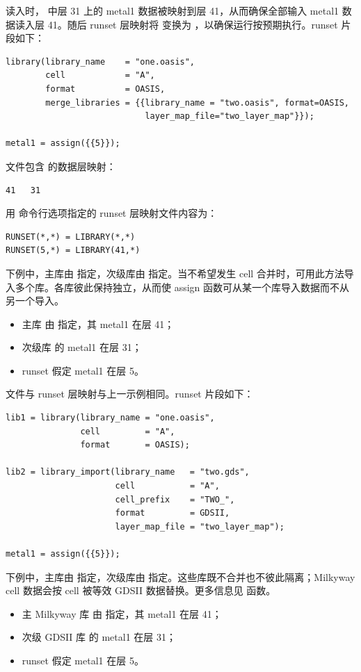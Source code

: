 读入时， 中层 31 上的 metal1 数据被映射到层 41，从而确保全部输入 metal1 数据读入层 41。随后 runset 层映射将  变换为 ，以确保运行按预期执行。runset 片段如下：
\begin{lstlisting}[style=pxl]
library(library_name    = "one.oasis",
        cell            = "A",
        format          = OASIS,
        merge_libraries = {{library_name = "two.oasis", format=OASIS,
                            layer_map_file="two_layer_map"}});

metal1 = assign({{5}});
\end{lstlisting}

 文件包含  的数据层映射：
\begin{lstlisting}
41   31
\end{lstlisting}

用  命令行选项指定的 runset 层映射文件内容为：
\begin{lstlisting}
RUNSET(*,*) = LIBRARY(*,*)
RUNSET(5,*) = LIBRARY(41,*)
\end{lstlisting}

下例中，主库由  指定，次级库由  指定。当不希望发生 cell 合并时，可用此方法导入多个库。各库彼此保持独立，从而使 assign 函数可从某一个库导入数据而不从另一个导入。
\begin{itemize}
  \item 主库  由  指定，其 metal1 在层 41；
  \item 次级库  的 metal1 在层 31；
  \item runset 假定 metal1 在层 5。
\end{itemize}

 文件与 runset 层映射与上一示例相同。runset 片段如下：
\begin{lstlisting}[style=pxl]
lib1 = library(library_name = "one.oasis",
               cell         = "A",
               format       = OASIS);

lib2 = library_import(library_name   = "two.gds",
                      cell           = "A",
                      cell_prefix    = "TWO_",
                      format         = GDSII,
                      layer_map_file = "two_layer_map");

metal1 = assign({{5}});
\end{lstlisting}

下例中，主库由  指定，次级库由  指定。这些库既不合并也不彼此隔离；Milkyway cell 数据会按 cell 被等效 GDSII 数据替换。更多信息见  函数。
\begin{itemize}
  \item 主 Milkyway 库  由  指定，其 metal1 在层 41；
  \item 次级 GDSII 库  的 metal1 在层 31；
  \item runset 假定 metal1 在层 5。
\end{itemize}

